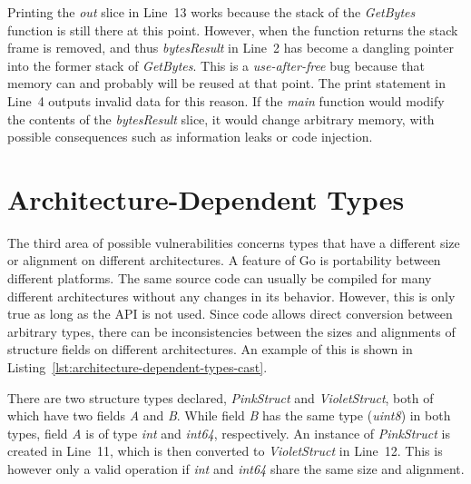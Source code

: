 Printing the \textit{out} slice in Line~13 works because the stack of the \textit{GetBytes} function is still there at
this point.
However, when the function returns the stack frame is removed, and thus \textit{bytesResult} in Line~2 has become a
dangling pointer into the former stack of \textit{GetBytes}.
This is a \textit{use-after-free} bug because that memory can and probably will be reused at that point.
The print statement in Line~4 outputs invalid data for this reason.
If the \textit{main} function would modify the contents of the \textit{bytesResult} slice, it would change arbitrary
memory, with possible consequences such as information leaks or code injection.



\section{Architecture-Dependent Types}\label{sec:unsafe-security-problems:architecture-dependent-types}

The third area of possible vulnerabilities concerns types that have a different size or alignment on different
architectures.
A feature of Go is portability between different platforms.
The same source code can usually be compiled for many different architectures without any changes in its behavior.
However, this is only true as long as the \unsafe{} \acrshort{API} is not used.
Since \unsafe{} code allows direct conversion between arbitrary types, there can be inconsistencies between the sizes
and alignments of structure fields on different architectures.
An example of this is shown in Listing~\ref{lst:architecture-dependent-types-cast}.



There are two structure types declared, \textit{PinkStruct} and \textit{VioletStruct}, both of which have two fields
\textit{A} and \textit{B}.
While field \textit{B} has the same type (\textit{uint8}) in both types, field \textit{A} is of type \textit{int} and
\textit{int64}, respectively.
An instance of \textit{PinkStruct} is created in Line~11, which is then converted to \textit{VioletStruct} in Line~12.
This is however only a valid operation if \textit{int} and \textit{int64} share the same size and alignment.

